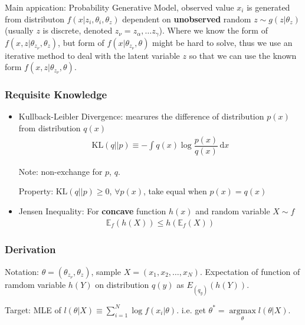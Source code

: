     Main appication: Probability Generative Model, observed value $ x_i $ is generated from distributon $ f(x|z_i,\theta _{i},\theta _z) $ dependent on \textbf{unobserved} random $ z\sim g(z|\theta _z) $(usually $ z $ is discrete, denoted $ z_\nu= z_\alpha ,\ldots z_\gamma  $). Where we know the form of $ f(x,z|\theta_{z_\nu},\theta_z) $, but form of $ f(x|\theta_{z_\nu},\theta) $ might be hard to solve, thus we use an iterative method to deal with the latent variable $ z $ so that we can use the known form $ f(x,z|\theta_{z_\nu},\theta) $.

\subsubsection{Requisite Knowledge}
    \begin{itemize}[topsep=2pt,itemsep=0pt]
        \item Kullback-Leibler Divergence: mearures the difference of distribution $ p(x) $ from distribution $ q(x) $
        \begin{align}
             \mathrm{KL}(q||p)\equiv -\int q(x)\log\dfrac{p(x)}{q(x)} \,\mathrm{d}x 
        \end{align}

        Note: non-exchange for $ p $, $ q $.

        Property: $ \mathrm{KL}(q||p)\geq 0  $, $ \forall p(x) $, take equal when $ p(x)=q(x) $
        \item Jensen Inequality: For \textbf{concave}  function $ h(x) $ and random variable $ X\sim f $
        \begin{align}
            \mathbb{E}_f\left(h(X)\right)\leq h\left(\mathbb{E}_f(X)\right) 
        \end{align}
        
        
        
        
    \end{itemize}
    
        
\subsubsection{Derivation}
    Notation: $ \theta=(\theta_{z_\nu},\theta_z) $, sample $ X=(x_{1},x_{2},\ldots,x_{N})  $. Expectation of function of ramdom variable $ h(Y) $ on distribution $ q(y) $ as $ E_{(q_y)}\left(h(Y)\right) $.

    Target: MLE of $ l(\theta|X)\equiv \sum_{i=1}^N\log f(x_i|\theta) $. i.e. get $ \theta ^*=\mathop{\arg\max}\limits_{\theta} l(\theta|X) $. 
    
